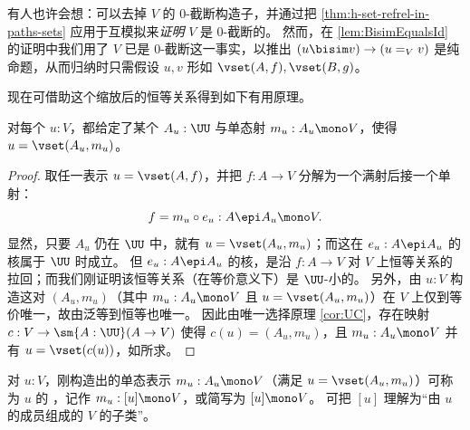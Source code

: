 有人也许会想：可以去掉 $V$ 的 0-截断构造子，并通过把 \cref{thm:h-set-refrel-in-paths-sets} 应用于互模拟来\emph{证明} $V$ 是 0-截断的。
然而，在 \cref{lem:BisimEqualsId} 的证明中我们用了 $V$ 已是 0-截断这一事实，以推出 $(u \bisim v)\to (u=_V v)$ 是纯命题，从而归纳时只需假设 $u,v$ 形如 $\vset(A,f),\vset(B,g)$。

现在可借助这个缩放后的恒等关系得到如下有用原理。

\begin{lem}\label{lem:MonicSetPresent}
对每个 $u:V$，都给定了某个 $A_u:\UU$ 与单态射 $m_u: A_u \mono V$，使得 $u = \vset(A_u, m_u)$。
\end{lem}

\begin{proof}
  取任一表示 $u = \vset(A,f)$，并把 $f:A\to V$ 分解为一个满射后接一个单射：
  \begin{equation*}
    f = m_u\circ e_u : A \epi A_u \mono V.
  \end{equation*}
  显然，只要 $A_u$ 仍在 $\UU$ 中，就有 $u = \vset(A_u, m_u)$；而这在 $e_u : A \epi A_u$ 的核属于 $\UU$ 时成立。
  但 $e_u : A \epi A_u$ 的核，是沿 $f : A\to V$ 对 $V$ 上恒等关系的拉回；而我们刚证明该恒等关系（在等价意义下）是 $\UU$-小的。
  另外，由 $u:V$ 构造这对 $(A_u,m_u)$（其中 $m_u :A_u \mono V$ 且 $u = \vset(A_u, m_u)$）在 $V$ 上仅到等价唯一，故由泛等到恒等也唯一。
  因此由唯一选择原理 \eqref{cor:UC}，存在映射 $c : V\to\sm{A:\UU}(A\to V)$ 使得 $c(u) = (A_u, m_u)$，且 $m_u :A_u \mono V$ 并有 $u = \vset(c(u))$，如所求。
\end{proof}

\begin{defn}\label{def:TypeOfElements}
  对 $u:V$，刚构造出的单态表示 $m_u: A_u \mono V$（满足 $u = \vset(A_u, m_u)$）可称为 $u$ 的
  ，记作 $m_u : [u] \mono V$，或简写为 $[u] \mono V$。
  可把 $[u]$ 理解为“由 $u$ 的成员组成的 $V$ 的子类”。
\end{defn}

